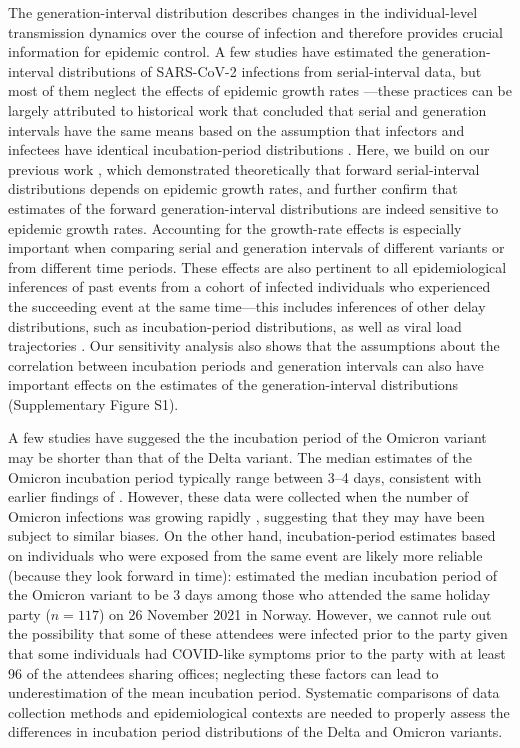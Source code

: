 \documentclass[12pt]{article}
\begin{document}
The generation-interval distribution describes changes in the individual-level transmission dynamics over the course of infection and therefore provides crucial information for epidemic control.
A few studies have estimated the generation-interval distributions of SARS-CoV-2 infections from serial-interval data, but most of them neglect the effects of epidemic growth rates \citep{ganyani2020estimating,he2020temporal,zhao2021estimating,hart2022generation}---these practices can be largely attributed to historical work that concluded that serial and generation intervals have the same means based on the assumption that infectors and infectees have identical incubation-period distributions \citep{svensson2007note,britton2019estimation,lehtinen2021relationship}.
Here, we build on our previous work \citep{park2021forward}, which demonstrated theoretically that forward serial-interval distributions depends on epidemic growth rates, and further confirm that estimates of the forward generation-interval distributions are indeed sensitive to epidemic growth rates.
Accounting for the growth-rate effects is especially important when comparing serial and generation intervals of different variants or from different time periods.
These effects are also pertinent to all epidemiological inferences of past events from a cohort of infected individuals who experienced the succeeding event at the same time---this includes inferences of other delay distributions, such as incubation-period distributions, as well as viral load trajectories \citep{hay2021estimating}.
Our sensitivity analysis also shows that the assumptions about the correlation between incubation periods and generation intervals can also have important effects on the estimates of the generation-interval distributions (Supplementary Figure S1).

A few studies have suggesed the the incubation period of the Omicron variant may be shorter than that of the Delta variant.
The median estimates of the Omicron incubation period typically range between 3--4 days, consistent with earlier findings of \citep{backer2021omicron}. 
However, these data were collected when the number of Omicron infections was growing rapidly \citep{jansen2021investigation,song2022serial}, suggesting that they may have been subject to similar biases.
On the other hand, incubation-period estimates based on individuals who were exposed from the same event are likely more reliable (because they look forward in time):
\cite{brandal2021outbreak} estimated the median incubation period of the Omicron variant to be 3 days among those who attended the same holiday party ($n=117$) on 26 November 2021 in Norway. 
However, we cannot rule out the possibility that some of these attendees were infected prior to the party given that some individuals had COVID-like symptoms prior to the party with at least 96 of the attendees sharing offices; neglecting these factors can lead to underestimation of the mean incubation period.
Systematic comparisons of data collection methods and epidemiological contexts are needed to properly assess the differences in incubation period distributions of the Delta and Omicron variants.
\end{document}
